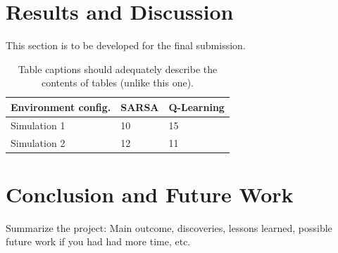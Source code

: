\documentclass[journal, a4paper]{IEEEtran}
\begin{document}
\section{Results and Discussion}
This section is to be developed for the final submission.




\begin{table}[ht]
	\caption{\label{results_table}Table captions should adequately describe the contents of tables (unlike this one).}
	\centering
	\begin{tabular}{lll}
		\hline
		\textbf{Environment config.} & \textbf{SARSA} & \textbf{Q-Learning}  \\
		\hline
		Simulation 1        & 10             & 15 \\
		Simulation 2        & 12             & 11 \\
		\hline
	\end{tabular}
\end{table}

\section{Conclusion and Future Work}
	Summarize the project: Main outcome, discoveries, lessons learned, possible future work if you had had more time, etc. %
\end{document}
